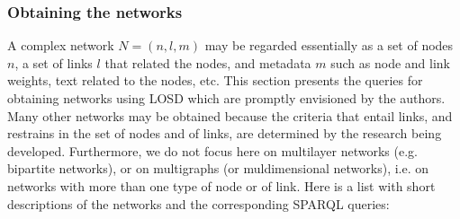 \documentclass[journal,article,submit,moreauthors,pdftex]{Definitions/mdpi}
\begin{document}
\subsubsection{Obtaining the networks}\label{snet}
A complex network $N=(n,l,m)$ may be regarded essentially as
a set of nodes $n$, a set of links $l$ that related the nodes,
and metadata $m$ such as node and link weights, text related to the nodes, etc.
This section presents the queries for obtaining networks using LOSD
which are promptly envisioned by the authors.
Many other networks may be obtained because the criteria that entail
links, and restrains in the set of nodes and of links,
are determined by the research being developed.
Furthermore, we do not focus here on multilayer networks (e.g. bipartite networks), or on multigraphs (or muldimensional networks), i.e. on networks with more than one type of node or of link.
Here is a list with short descriptions of the networks and the corresponding SPARQL queries:
\end{document}
